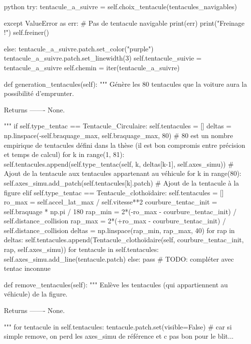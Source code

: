 \begin{mintedbox}{python}
        try:
            tentacule_a_suivre = self.choix_tentacule(tentacules_navigables)

        except ValueError as err:  # Pas de tentacule navigable
            print(err)
            print("Freinage !")
            self.freiner()

        else:
            tentacule_a_suivre.patch.set_color("purple")
            tentacule_a_suivre.patch.set_linewidth(3)
            self.tentacule_suivie = tentacule_a_suivre
            self.chemin = iter(tentacule_a_suivre)

    def generation_tentacules(self):
        """
        Génère les 80 tentacules que la voiture aura la possibilité d'emprunter.

        Returns
        -------
        None.

        """
        if self.type_tentac == Tentacule_Circulaire:
            self.tentacules = []
            deltas = np.linspace(-self.braquage_max, self.braquage_max, 80)  # 80 est un nombre empirique de tentacules défini dans la thèse (il est bon compromis entre précision et temps de calcul)
            for k in range(1, 81):
                self.tentacules.append(self.type_tentac(self, k, deltas[k-1], self.axes_simu))  # Ajout de la tentacule aux tentacules appartenant au véhicule
            for k in range(80):
                self.axes_simu.add_patch(self.tentacules[k].patch)  # Ajout de la tentacule à la figure
        elif self.type_tentac == Tentacule_clothoïdaire:
            self.tentacules = []
            ro_max = self.accel_lat_max / self.vitesse**2
            courbure_tentac_init = self.braquage * np.pi / 180
            rap_min = 2*(-ro_max - courbure_tentac_init) / self.distance_collision
            rap_max = 2*(+ro_max - courbure_tentac_init) / self.distance_collision
            deltas = np.linspace(rap_min, rap_max, 40)
            for rap in deltas:
                self.tentacules.append(Tentacule_clothoïdaire(self, courbure_tentac_init, rap, self.axes_simu))
            for tentacule in self.tentacules:
                self.axes_simu.add_line(tentacule.patch)
        else:
            pass  # TODO: compléter avec tentac inconnue

    def remove_tentacules(self):
        """
        Enlève les tentacules (qui appartiennent au véhicule) de la figure.

        Returns
        -------
        None.

        """
        for tentacule in self.tentacules:
            tentacule.patch.set(visible=False)  # car si simple remove, on perd les axes_simu de référence et c pas bon pour le blit...


\end{mintedbox}
